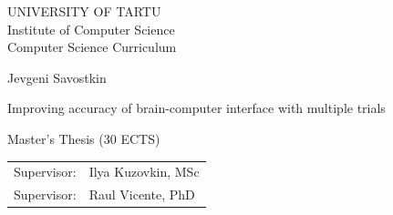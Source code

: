\documentclass[12pt]{article}
\begin{document}
\thispagestyle{empty}
\begin{center}

\large
UNIVERSITY OF TARTU\\[2mm]
Institute of Computer Science\\
Computer Science Curriculum\\[2mm]

\vspace{25mm}

\Large Jevgeni Savostkin

\vspace{4mm}

\huge Improving accuracy of brain-computer interface with multiple trials

\vspace{20mm}

\Large Master's Thesis (30 ECTS)

\end{center}

\vspace{2mm}

\begin{flushright}
 {
 \setlength{\extrarowheight}{5pt}
 \begin{tabular}{r l} 
  \sffamily Supervisor: & \sffamily Ilya Kuzovkin, MSc \\ 
  \sffamily Supervisor: & \sffamily Raul Vicente, PhD 
 \end{tabular}
 }
\end{flushright}

\vspace{10mm}

\vspace{2mm}



\vspace{2mm}


\vspace{8mm}
\end{document}
